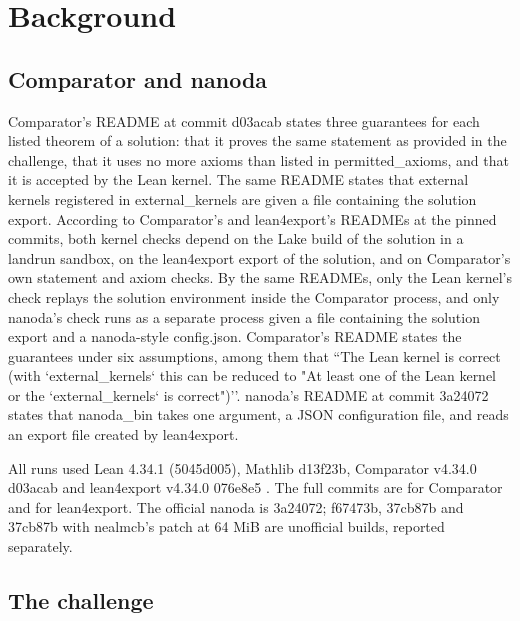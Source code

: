 \section{Background}\label{sec:background}

\subsection{Comparator and nanoda}

Comparator's README at commit d03acab \cite{comparator} states three guarantees for each listed theorem of a solution: that it proves the same statement as provided in the challenge, that it uses no more axioms than listed in permitted\_axioms, and that it is accepted by the Lean kernel. %
The same README states that external kernels registered in external\_kernels are given a file containing the solution export. %
According to Comparator's and lean4export's READMEs at the pinned commits, both kernel checks depend on the Lake build of the solution in a landrun sandbox, on the lean4export export of the solution, and on Comparator's own statement and axiom checks. %
By the same READMEs, only the Lean kernel's check replays the solution environment inside the Comparator process, and only nanoda's check runs as a separate process given a file containing the solution export and a nanoda-style config.json. %
Comparator's README states the guarantees under six assumptions, among them that ``The Lean kernel is correct (with `external\_kernels` this can be reduced to "At least one of the Lean kernel or the `external\_kernels` is correct")''. %
nanoda's README at commit 3a24072 \cite{nanoda-lib} states that nanoda\_bin takes one argument, a JSON configuration file, and reads an export file created by lean4export. %

All runs used Lean 4.34.1 (5045d005), Mathlib d13f23b, Comparator v4.34.0 d03acab and lean4export v4.34.0 076e8e5 \cite{lean4,mathlib,comparator,lean4export}. %
The full commits are  for Comparator and  for lean4export. %
The official nanoda is 3a24072; f67473b, 37cb87b and 37cb87b with nealmcb's patch at 64 MiB are unofficial builds, reported separately. %

\subsection{The challenge}

